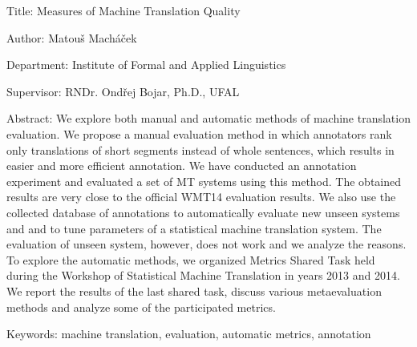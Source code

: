 Title:
Measures of Machine Translation Quality

Author:
Matouš Macháček

Department:
Institute of Formal and Applied Linguistics

Supervisor:
RNDr. Ondřej Bojar, Ph.D., UFAL

Abstract: We explore both manual and automatic methods of machine translation
evaluation. We propose a manual evaluation method in which annotators rank only
translations of short segments instead of whole sentences, which results in
easier and more efficient annotation. We have conducted an annotation
experiment and evaluated a set of MT systems using this method. The obtained
results are very close to the official WMT14 evaluation results. We also use
the collected database of annotations to automatically evaluate new unseen
systems and and to tune parameters of a statistical machine translation system.
The evaluation of unseen system, however, does not work and we analyze the
reasons. To explore the automatic methods, we organized Metrics Shared Task
held during the Workshop of Statistical Machine Translation in years 2013 and
2014. We report the results of the last shared task, discuss various
metaevaluation methods and analyze some of the participated metrics.


Keywords:
machine translation, evaluation, automatic metrics, annotation
